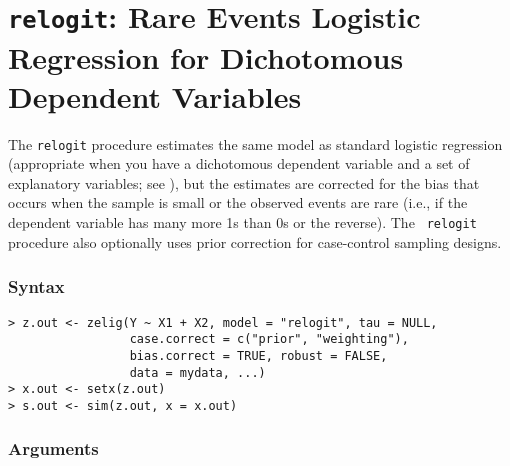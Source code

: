 \section{{\tt relogit}: Rare Events Logistic Regression for
Dichotomous Dependent Variables}
\label{relogit}

The {\tt relogit} procedure estimates the same model as standard
logistic regression (appropriate when you have a dichotomous dependent
variable and a set of explanatory variables; see ), but
the estimates are corrected for the bias that occurs when the
sample is small or the observed events are rare (i.e., if the
dependent variable has many more 1s than 0s or the reverse).  The {\tt
  relogit} procedure also optionally uses prior correction for
case-control sampling designs.  

\subsubsection{Syntax}

\begin{verbatim}
> z.out <- zelig(Y ~ X1 + X2, model = "relogit", tau = NULL,
                 case.correct = c("prior", "weighting"), 
                 bias.correct = TRUE, robust = FALSE, 
                 data = mydata, ...)
> x.out <- setx(z.out)
> s.out <- sim(z.out, x = x.out)
\end{verbatim}

\subsubsection{Arguments}

